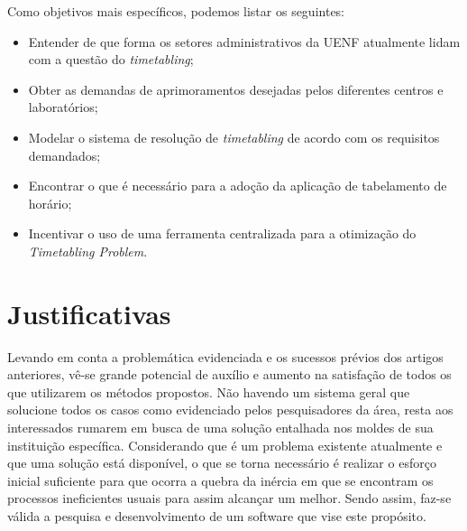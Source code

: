         Como objetivos mais específicos, podemos listar os seguintes:

        \begin{itemize}
            \item Entender de que forma os setores administrativos da UENF atualmente lidam com a questão do \textit{timetabling};
            \item Obter as demandas de aprimoramentos desejadas pelos diferentes centros e laboratórios;
            \item Modelar o sistema de resolução de \textit{timetabling} de acordo com os requisitos demandados;
            \item Encontrar o que é necessário para a adoção da aplicação de tabelamento de horário;
            \item Incentivar o uso de uma ferramenta centralizada para a otimização do \textit{Timetabling Problem}.
        \end{itemize}


\section{Justificativas} %

    Levando em conta a problemática evidenciada e os sucessos prévios dos artigos anteriores, vê-se grande potencial de auxílio e aumento na satisfação de todos os que utilizarem os métodos propostos. Não havendo um sistema geral que solucione todos os casos como evidenciado pelos pesquisadores da área, resta aos interessados rumarem em busca de uma solução entalhada nos moldes de sua instituição específica. Considerando que é um problema existente atualmente e que uma solução está disponível, o que se torna necessário é realizar o esforço inicial suficiente para que ocorra a quebra da inércia em que se encontram os processos ineficientes usuais para assim alcançar um melhor. Sendo assim, faz-se válida a pesquisa e desenvolvimento de um software que vise este propósito.

